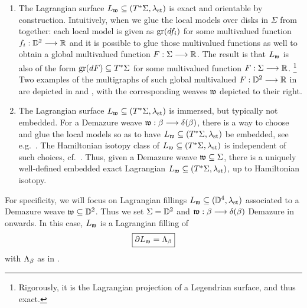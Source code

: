 \begin{enumerate}
    \item The Lagrangian surface $L_{\mathfrak{w}}\subseteq (T^*\Sigma,\lambda_{\text{st}})$ is exact and orientable by construction. Intuitively, when we glue the local models over disks in $\Sigma$ from  together: each local model is given as $\operatorname{gr}(df_i)$ for some multivalued function $f_i:\mathbb{D}^2\longrightarrow\mathbb{R}$ and it is possible to glue those multivalued functions as well to obtain a global multivalued function $F:\Sigma\longrightarrow\mathbb{R}$. The result is that $L_{\mathfrak{w}}$ is also of the form $\operatorname{gr}(dF)\subseteq T^*\Sigma$ for some multivalued function $F:\Sigma\longrightarrow\mathbb{R}$. \footnote{Rigorously, it is the Lagrangian projection of a Legendrian surface, and thus exact.}\\

    \noindent Two examples of the multigraphs of such global multivalued $F:\mathbb{D}^2\longrightarrow\mathbb{R}$ in  are depicted in  and , with the corresponding weaves $\mathfrak{w}$ depicted to their right.\\

    \item The Lagrangian surface $L_{\mathfrak{w}}\subseteq (T^*\Sigma,\lambda_{\text{st}})$ is immersed, but typically not embedded. For a Demazure weave $\mathfrak{w}:\beta\longrightarrow\delta(\beta)$, there is a way to choose and glue the local models so as to have $L_{\mathfrak{w}}\subseteq (T^*\Sigma,\lambda_{\text{st}})$ be embedded, see e.g.~\cite[Section 7.1]{casals2025spectralnetworksbettilagrangians}. The Hamiltonian isotopy class of $L_{\mathfrak{w}}\subseteq (T^*\Sigma,\lambda_{\text{st}})$ is independent of such choices, cf.~\cite[Section 2]{casals2022conjugate}. Thus, given a Demazure weave $\mathfrak{w}\subseteq\Sigma$, there is a uniquely well-defined embedded exact Lagrangian $L_{\mathfrak{w}}\subseteq (T^*\Sigma,\lambda_{\text{st}})$, up to Hamiltonian isotopy.\\
\end{enumerate}

\noindent For specificity, we will focus on Lagrangian fillings $L_{\mathfrak{w}}\subseteq(\mathbb{D}^4,\lambda_{\text{st}})$ associated to a Demazure weave $\mathfrak{w}\subseteq\mathbb{D}^2$. Thus we set $\Sigma=\mathbb{D}^2$ and $\mathfrak{w}:\beta\longrightarrow\delta(\beta)$ Demazure in  onwards. In this case, $L_{\mathfrak{w}}$ is a Lagrangian filling of
$$\boxed{\partial L_{\mathfrak{w}}=\Lambda_\beta}$$
with $\Lambda_\beta$ as in .

